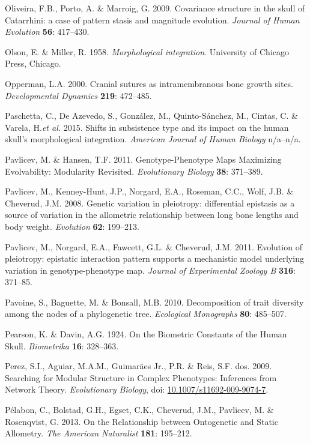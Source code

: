 \documentclass[12pt,twoside]{report}
\begin{document}
Oliveira, F.B., Porto, A. \& Marroig, G. 2009. Covariance structure in
the skull of Catarrhini: a case of pattern stasis and magnitude
evolution. \emph{Journal of Human Evolution} \textbf{56}: 417--430.

Olson, E. \& Miller, R. 1958. \emph{Morphological integration}.
University of Chicago Press, Chicago.

Opperman, L.A. 2000. Cranial sutures as intramembranous bone growth
sites. \emph{Developmental Dynamics} \textbf{219}: 472--485.

Paschetta, C., De Azevedo, S., González, M., Quinto-Sánchez, M., Cintas,
C. \& Varela, H.\emph{et al.} 2015. Shifts in subsistence type and its
impact on the human skull's morphological integration. \emph{American
Journal of Human Biology} n/a--n/a.

Pavlicev, M. \& Hansen, T.F. 2011. Genotype-Phenotype Maps Maximizing
Evolvability: Modularity Revisited. \emph{Evolutionary Biology}
\textbf{38}: 371--389.

Pavlicev, M., Kenney-Hunt, J.P., Norgard, E.A., Roseman, C.C., Wolf,
J.B. \& Cheverud, J.M. 2008. Genetic variation in pleiotropy:
differential epistasis as a source of variation in the allometric
relationship between long bone lengths and body weight. \emph{Evolution}
\textbf{62}: 199--213.

Pavlicev, M., Norgard, E.A., Fawcett, G.L. \& Cheverud, J.M. 2011.
Evolution of pleiotropy: epistatic interaction pattern supports a
mechanistic model underlying variation in genotype-phenotype map.
\emph{Journal of Experimental Zoology B} \textbf{316}: 371--85.

Pavoine, S., Baguette, M. \& Bonsall, M.B. 2010. Decomposition of trait
diversity among the nodes of a phylogenetic tree. \emph{Ecological
Monographs} \textbf{80}: 485--507.

Pearson, K. \& Davin, A.G. 1924. On the Biometric Constants of the Human
Skull. \emph{Biometrika} \textbf{16}: 328--363.

Perez, S.I., Aguiar, M.A.M., Guimarães Jr., P.R. \& Reis, S.F. dos.
2009. Searching for Modular Structure in Complex Phenotypes: Inferences
from Network Theory. \emph{Evolutionary Biology}, doi:
\href{http://dx.doi.org/10.1007/s11692-009-9074-7}{10.1007/s11692-009-9074-7}.

Pélabon, C., Bolstad, G.H., Egset, C.K., Cheverud, J.M., Pavlicev, M. \&
Rosenqvist, G. 2013. On the Relationship between Ontogenetic and Static
Allometry. \emph{The American Naturalist} \textbf{181}: 195--212.
\end{document}
